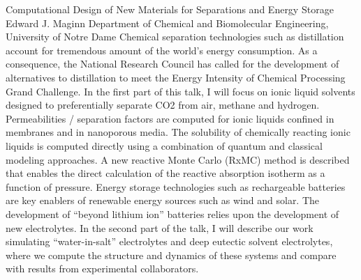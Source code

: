 
    \begin{abstract_online}{Computational Design of New Materials for Separations and Energy Storage}{%
        Edward J. Maginn}{%
        \KLtag}{%
        Department of Chemical and Biomolecular Engineering, University of Notre Dame}
    Chemical separation technologies such as distillation account for tremendous amount of the world’s energy consumption. As a consequence, the National Research Council has called for the development of alternatives to distillation to meet the Energy Intensity of Chemical Processing Grand Challenge. In the first part of this talk, I will focus on ionic liquid solvents designed to preferentially separate CO2 from air, methane and hydrogen. Permeabilities / separation factors are computed for ionic liquids confined in membranes and in nanoporous media. The solubility of chemically reacting ionic liquids is computed directly using a combination of quantum and classical modeling approaches. A new reactive Monte Carlo (RxMC) method is described that enables the direct calculation of the reactive absorption isotherm as a function of pressure. Energy storage technologies such as rechargeable batteries are key enablers of renewable energy sources such as wind and solar. The development of “beyond lithium ion” batteries relies upon the development of new electrolytes. In the second part of the talk, I will describe our work simulating “water-in-salt” electrolytes and deep eutectic solvent electrolytes, where we compute the structure and dynamics of these systems and compare with results from experimental collaborators. 
    
    \end{abstract_online}
    